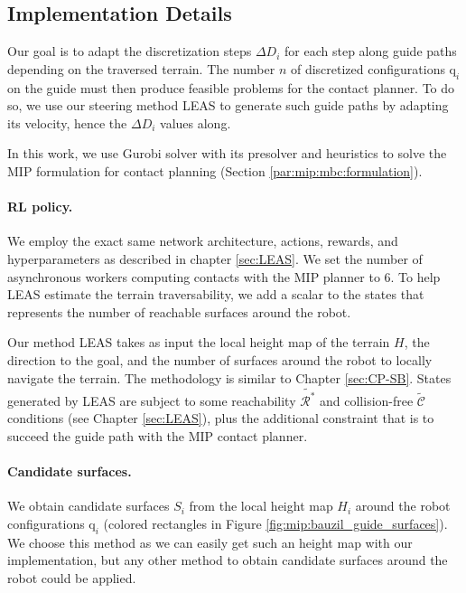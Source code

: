 
\subsection{Implementation Details}
\label{subsub:mip:implementation_details}
Our goal is to adapt the discretization steps $\Delta D_i$ for each step along guide paths depending on the traversed terrain.
The number $n$ of discretized configurations $\mbox{q}_i$ on the guide must then produce feasible problems for the contact planner.
To do so, we use our steering method LEAS to generate such guide paths by adapting its velocity, hence the $\Delta D_i$ values along.

In this work, we use Gurobi solver \cite{gurobi} with its presolver and heuristics to solve the MIP formulation for contact planning (Section \ref{par:mip:mbc:formulation}).

\paragraph{RL policy.}
We employ the exact same network architecture, actions, rewards, and hyperparameters as described in chapter \ref{sec:LEAS}. We set the number of asynchronous workers computing contacts with the MIP planner to 6.
To help LEAS estimate the terrain traversability, we add a scalar to the states that represents the number of reachable surfaces around the robot.

Our method LEAS takes as input the local height map of the terrain $H$, the direction to the goal, and the number of surfaces around the robot to locally navigate the terrain. 
The methodology is similar to Chapter \ref{sec:CP-SB}.
States generated by LEAS are subject to some reachability $\tilde{\mathcal{R}^*}$ and collision-free $\tilde{\mathcal{C}}$ conditions (see Chapter \ref{sec:LEAS}), plus the additional constraint that is to succeed the guide path with the MIP contact planner.


\paragraph{Candidate surfaces.}
We obtain candidate surfaces $S_i$ from the local height map $H_i$ around the robot configurations $\mbox{q}_i$ (colored rectangles in Figure \ref{fig:mip:bauzil_guide_surfaces}).
We choose this method as we can easily get such an height map with our implementation, but any other method to obtain candidate surfaces around the robot could be applied.

